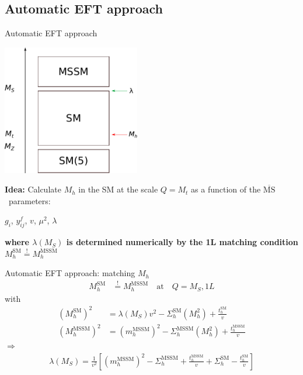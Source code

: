 \documentclass[hyperref={pdfpagelabels=false},ngerman]{beamer}
\renewcommand{\emph}{\textbf}
\newcommand{\MSbar}{\ensuremath{\overline{\text{MS}}}}
\newcommand{\SM}{\ensuremath{\text{SM}}}
\newcommand{\MSSM}{\ensuremath{\text{MSSM}}}
\begin{document}

\subsection{Automatic EFT approach}

\begin{frame}{Automatic EFT approach}
  \begin{center}
    \includegraphics[width=0.45\textwidth]{images/mssm-sm-tower-eft}\\[1em]
  \end{center}
  \emph{Idea:} Calculate $M_h$ in the SM at the scale $Q = M_t$ as a function of the \MSbar\ parameters:\\[1em]
  \begin{center}
    $g_i$, $y^f_{ij}$, $v$, $\mu^2$, $\lambda$
  \end{center}
  \emph{where $\lambda(M_S)$ is determined numerically by the 1L
    matching condition} $M_h^{\SM} \overset{!}{=} M_h^\text{MSSM}$
\end{frame}

\begin{frame}{Automatic EFT approach: matching $M_h$}
  \begin{align*}
    M_h^{\SM} &\overset{!}{=} M_h^\text{MSSM} \quad \text{at} \quad Q = M_S, 1L
  \end{align*}
  with
  \begin{align*}
    (M_h^{\SM})^2 &= \lambda(M_S) v^2 - \Sigma^{\SM}_h(M_h^2) + \frac{t_h^\SM}{v} \\
    (M_h^\text{MSSM})^2 &= (m_h^\text{MSSM})^2 - \Sigma^{\MSSM}_h(M_h^2) + \frac{t_h^\text{MSSM}}{v}
  \end{align*}
  $\Rightarrow$
  \begin{align*}
    \lambda(M_S) = \frac{1}{v^2} \left[
      (m_h^\text{MSSM})^2 - \Sigma^{\MSSM}_h + \frac{t_h^\text{MSSM}}{v}
      + \Sigma^{\SM}_h - \frac{t_h^\SM}{v}
    \right]
  \end{align*}
\end{frame}
\end{document}
